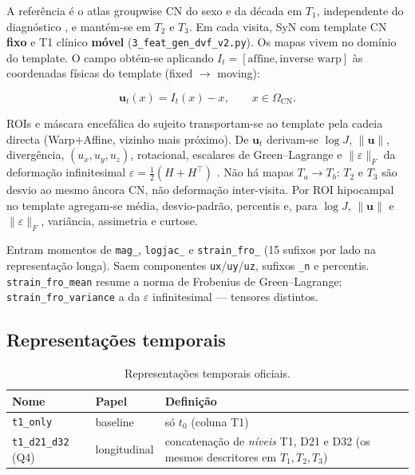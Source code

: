 \documentclass[review]{elsarticle}
\newcommand{\code}[1]{\texttt{#1}}
\begin{document}
			A referência é o atlas groupwise CN do sexo e da década em $T_1$, independente do diagnóstico \cite{wyman-2013}, e mantém-se em $T_2$ e $T_3$.
			Em cada visita, SyN com template CN \textbf{fixo} e T1 clínico \textbf{móvel} (\code{3\_feat\_gen\_dvf\_v2.py}).
			Os mapas vivem no domínio do template. O campo obtém-se aplicando $I_t=[\text{affine},\text{inverse warp}]$ às coordenadas físicas do template (fixed $\rightarrow$ moving):
		
			\begin{equation}
				\mathbf{u}_t(x)=I_t(x)-x,\qquad x\in\Omega_{\mathrm{CN}}.
				\label{eq:dvf-template}
			\end{equation}
			
			ROIs e máscara encefálica do sujeito transportam-se ao template pela cadeia directa (Warp$+$Affine, vizinho mais próximo).
			De $\mathbf{u}_t$ derivam-se $\log J$, $\|\mathbf{u}\|$, divergência, $(u_x,u_y,u_z)$, rotacional, escalares de Green--Lagrange e $\|\varepsilon\|_F$ da deformação infinitesimal $\varepsilon=\tfrac12(H+H^{\top})$ \cite{bouke-2023}.
			Não há mapas $T_a\rightarrow T_b$: $T_2$ e $T_3$ são desvio ao mesmo âncora CN, não deformação inter-visita.
			Por ROI hipocampal no template agregam-se média, desvio-padrão, percentis e, para $\log J$, $\|\mathbf{u}\|$ e $\|\varepsilon\|_F$, variância, assimetria e curtose.
			
			Entram momentos de \code{mag\_}, \code{logjac\_} e \code{strain\_fro\_} (15 sufixos por lado na representação longa).
			Saem componentes \code{ux}/\code{uy}/\code{uz}, sufixos \code{\_n} e percentis.
			\code{strain\_fro\_mean} resume a norma de Frobenius de Green--Lagrange; \code{strain\_fro\_variance} a da $\varepsilon$ infinitesimal --- tensores distintos.

	\subsection{Representações temporais}\label{sec:atributos}

		\begin{table}[htbp]
			\centering
			\caption{Representações temporais oficiais.}
			\label{tab:reps}
				\begin{tabular}{llp{7.4cm}}
					\toprule
					Nome & Papel & Definição \\
					\midrule
					\code{t1\_only} & baseline & só $t_0$ (coluna T1) \\
					\code{t1\_d21\_d32} (Q4) & longitudinal & concatenação de \emph{níveis} T1, D21 e D32 (os mesmos descritores em $T_1,T_2,T_3$) \\
					\bottomrule
				\end{tabular}
		\end{table}
		
\end{document}
